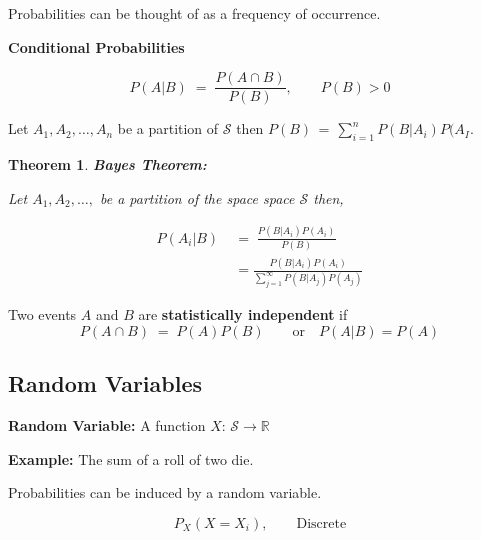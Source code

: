 \documentclass[10pt]{article}
\newtheorem{theorem}{Theorem}
\numberwithin{equation}{section}
\begin{document}
\noindent
Probabilities can be thought of as a frequency of occurrence.

\vspace{2mm}

\noindent
\textbf{Conditional Probabilities}

$$ P(A | B) \; = \; \frac{P(A \cap B)}{P(B)}, \qquad P(B) > 0$$


\noindent
Let $A_{1}, A_{2}, \ldots, A_{n}$ be a partition of $\mathcal{S}$ then $P(B) \, = \, \sum_{i=1}^{n} P(B|A_{i}) P(A_{I}$.


\vspace{2mm}

\begin{theorem}
\textbf{Bayes Theorem:} 

Let $A_{1}, A_{2}, \ldots,$ be a partition of the space space $\mathcal{S}$ then,

\begin{align}
P(A_{i} \vert B) \; &= \; \frac{P(B \vert A_{i}) P(A_{i})}{P(B)} \\
& = \frac{P(B \vert A_{i}) P(A_{i})}{\sum_{j=1}^{\infty} P(B \vert A_{j}) P(A_{j})}
\end{align}
\end{theorem}

\noindent
Two events $A$ and $B$ are \textbf{statistically independent} if
\begin{equation}
P(A \cap B ) \; = \; P(A) P(B) \qquad \text{or} \quad P(A \vert B) = P(A)
\end{equation}


\vspace{2mm}

\subsection{Random Variables}

\noindent
\textbf{Random Variable:} A function $X: \, \mathcal{S} \rightarrow \mathbb{R}$

\vspace{1mm}


\noindent
\textbf{Example:}  The sum of a roll of two die.


\vspace{2mm}

\noindent
Probabilities can be induced by a random variable.

$$ P_{X}(X = X_{i}), \qquad \text{Discrete} $$

\noindent
{} 
\end{document}
